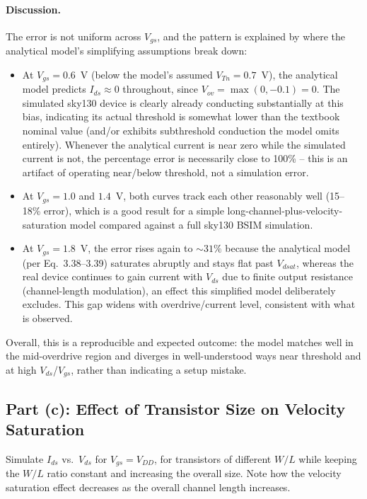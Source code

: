 \paragraph{Discussion.} The error is not uniform across $V_{gs}$, and the pattern is explained by where the analytical model's simplifying assumptions break down:
\begin{itemize}
  \item At $V_{gs}=0.6$~V (below the model's assumed $V_{Tn}=0.7$~V), the analytical model predicts $I_{ds}\approx 0$ throughout, since $V_{ov}=\max(0,-0.1)=0$. The simulated sky130 device is clearly already conducting substantially at this bias, indicating its actual threshold is somewhat lower than the textbook nominal value (and/or exhibits subthreshold conduction the model omits entirely). Whenever the analytical current is near zero while the simulated current is not, the percentage error is necessarily close to 100\% -- this is an artifact of operating near/below threshold, not a simulation error.
  \item At $V_{gs}=1.0$ and $1.4$~V, both curves track each other reasonably well (15--18\% error), which is a good result for a simple long-channel-plus-velocity-saturation model compared against a full sky130 BSIM simulation.
  \item At $V_{gs}=1.8$~V, the error rises again to $\sim\!31\%$ because the analytical model (per Eq.~3.38--3.39) saturates abruptly and stays flat past $V_{dsat}$, whereas the real device continues to gain current with $V_{ds}$ due to finite output resistance (channel-length modulation), an effect this simplified model deliberately excludes. This gap widens with overdrive/current level, consistent with what is observed.
\end{itemize}
Overall, this is a reproducible and expected outcome: the model matches well in the mid-overdrive region and diverges in well-understood ways near threshold and at high $V_{ds}$/$V_{gs}$, rather than indicating a setup mistake.

\subsection{Part (c): Effect of Transistor Size on Velocity Saturation}

Simulate $I_{ds}$ vs.\ $V_{ds}$ for $V_{gs} = V_{DD}$, for transistors of different $W/L$ while keeping the $W/L$ ratio constant and increasing the overall size. Note how the velocity saturation effect decreases as the overall channel length increases.


